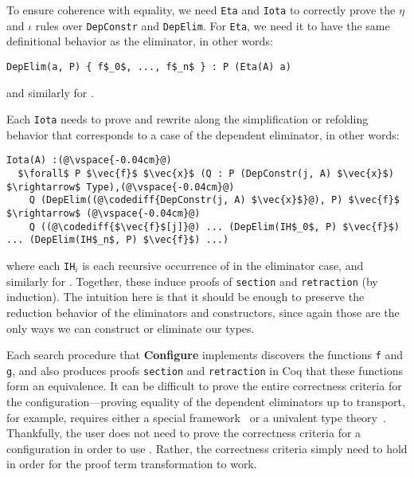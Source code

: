 To ensure coherence with equality, we need \lstinline{Eta} and \lstinline{Iota} to correctly prove the $\eta$ and $\iota$ rules
over \lstinline{DepConstr} and \lstinline{DepElim}.
For \lstinline{Eta}, we need it to have the same definitional behavior as the
eliminator, in other words:

\begin{lstlisting}
DepElim(a, P) { f$_0$, ..., f$_n$ } : P (Eta(A) a)
\end{lstlisting}
and similarly for \B. %

Each \lstinline{Iota} needs to prove and rewrite along the simplification or refolding behavior that corresponds to a case of the dependent eliminator, in other words: %

\begin{lstlisting}
Iota(A) :(@\vspace{-0.04cm}@)
  $\forall$ P $\vec{f}$ $\vec{x}$ (Q : P (DepConstr(j, A) $\vec{x}$) $\rightarrow$ Type),(@\vspace{-0.04cm}@)
    Q (DepElim((@\codediff{DepConstr(j, A) $\vec{x}$}@), P) $\vec{f}$ $\rightarrow$ (@\vspace{-0.04cm}@)
    Q ((@\codediff{$\vec{f}$[j]}@) ... (DepElim(IH$_0$, P) $\vec{f}$) ... (DepElim(IH$_n$, P) $\vec{f}$) ...)
\end{lstlisting}
where each \lstinline{IH}$_i$ is each recursive occurrence of \A in the eliminator case,
and similarly for \B.
Together, these induce proofs of \lstinline{section} and \lstinline{retraction} (by induction).
The intuition here is that it should be enough to preserve the reduction behavior
of the eliminators and constructors, since again those are the only ways we can construct or eliminate our types.

Each search procedure that \textbf{Configure} implements discovers the functions \lstinline{f} and \lstinline{g}, and also
produces proofs \lstinline{section} and \lstinline{retraction} in Coq that these functions form an equivalence.
It can be difficult to prove the entire correctness criteria for the configuration---proving equality of the dependent eliminators
up to transport, for example, requires either a special framework~\cite{tabareau2017equivalences}
or a univalent type theory~\cite{univalent2013homotopy}.
Thankfully, the user does not need to prove the correctness criteria for a configuration in order to use \toolname.
Rather, the correctness criteria simply need to hold in order for the proof term transformation to work.

